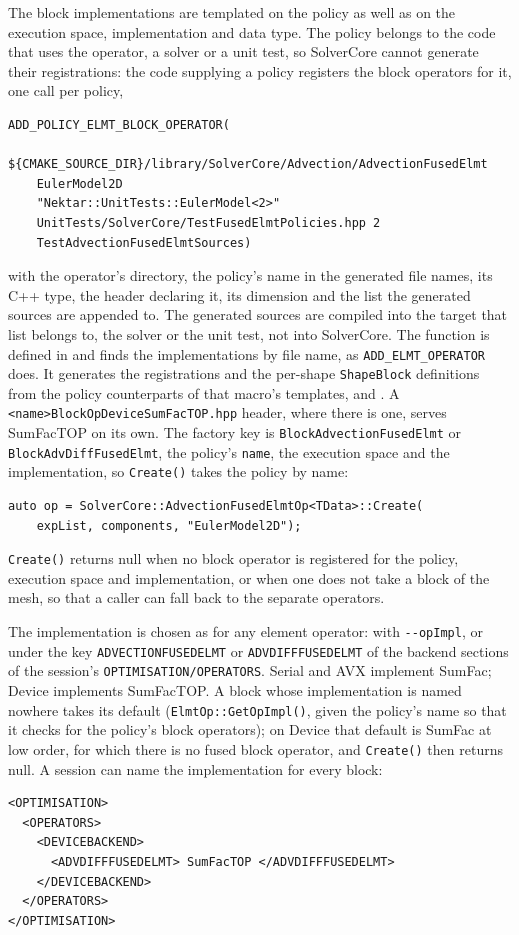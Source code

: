 The block implementations are templated on the policy as well as on the
execution space, implementation and data type. The policy belongs to the
code that uses the operator, a solver or a unit test, so SolverCore cannot
generate their registrations: the code supplying a policy registers the
block operators for it, one call per policy,
\begin{lstlisting}
ADD_POLICY_ELMT_BLOCK_OPERATOR(
    ${CMAKE_SOURCE_DIR}/library/SolverCore/Advection/AdvectionFusedElmt
    EulerModel2D
    "Nektar::UnitTests::EulerModel<2>"
    UnitTests/SolverCore/TestFusedElmtPolicies.hpp 2
    TestAdvectionFusedElmtSources)
\end{lstlisting}
with the operator's directory, the policy's name in the generated file
names, its C++ type, the header declaring it, its dimension and the list
the generated sources are appended to. The generated sources are compiled
into the target that list belongs to, the solver or the unit test, not into
SolverCore. The function is defined in  and
finds the implementations by file name, as \texttt{ADD\_ELMT\_OPERATOR}
does. It generates the registrations and the per-shape
\texttt{ShapeBlock} definitions from the policy counterparts of that
macro's templates, 
and . A \texttt{<name>BlockOpDeviceSumFacTOP.hpp} header, where
there is one, serves SumFacTOP on its own. The factory key is
\texttt{BlockAdvectionFusedElmt} or \texttt{BlockAdvDiffFusedElmt}, the
policy's \texttt{name}, the execution space and the implementation, so
\texttt{Create()} takes the policy by name:
\begin{lstlisting}[style=C++Style]
auto op = SolverCore::AdvectionFusedElmtOp<TData>::Create(
    expList, components, "EulerModel2D");
\end{lstlisting}
\texttt{Create()} returns null when no block operator is registered for the
policy, execution space and implementation, or when one does not take a
block of the mesh, so that a caller can fall back to the separate operators.

The implementation is chosen as for any element operator: with
\texttt{-{}-opImpl}, or under the key \texttt{ADVECTIONFUSEDELMT} or
\texttt{ADVDIFFFUSEDELMT} of the backend sections of the session's
\texttt{OPTIMISATION/OPERATORS}. Serial and AVX implement SumFac; Device
implements SumFacTOP. A block whose implementation is named nowhere takes
its default (\texttt{ElmtOp::GetOpImpl()}, given the policy's name so that
it checks for the policy's block operators); on Device that default is
SumFac at low order, for which there is no fused block operator, and
\texttt{Create()} then returns null. A session can name the implementation
for every block:
\begin{lstlisting}[style=XMLStyle]
<OPTIMISATION>
  <OPERATORS>
    <DEVICEBACKEND>
      <ADVDIFFFUSEDELMT> SumFacTOP </ADVDIFFFUSEDELMT>
    </DEVICEBACKEND>
  </OPERATORS>
</OPTIMISATION>
\end{lstlisting}

